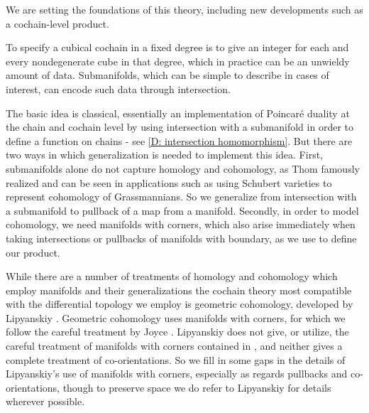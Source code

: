 We are setting the foundations of this theory, including new developments such as a cochain-level product.


To specify a cubical cochain in a fixed degree is to give an integer for each and every {nondegenerate cube} in that degree,
which in practice can be an unwieldy amount of data.
Submanifolds, which can be simple to describe in cases of interest, can encode such data through intersection.

The basic idea is classical, essentially an implementation of Poincar\'e duality at the chain and cochain level by using intersection with a
submanifold in order to define a function on chains - see \cref{D: intersection homomorphism}.
But there are two ways in which generalization is needed to implement this idea.
First, submanifolds alone do not capture homology and cohomology, as Thom famously realized and can be
seen in applications such as using Schubert varieties to represent cohomology of Grassmannians.
So we generalize from intersection with a submanifold to pullback of a map from a manifold.
Secondly, in order to model cohomology, we need manifolds with corners, which also arise immediately when taking intersections or pullbacks of manifolds with boundary, as we use to define our product.

While there are a number of treatments of homology and cohomology which employ manifolds and their
generalizations \cite{Whit47, BRS76, FeSj83, Krec10, Kahn01, Zing08, Joyc15} the cochain theory most compatible with the differential topology we employ is geometric cohomology, developed by Lipyanskiy \cite{Lipy14}.
Geometric cohomology uses manifolds with corners, for which we follow the careful treatment by Joyce \cite{Joy12}.
Lipyanskiy does not give, or utilize, the careful treatment of manifolds with corners contained in \cite{Joy12}, and neither gives a complete treatment of co-orientations. So we fill in some gaps in the details of Lipyanskiy's use of manifolds with corners, especially as regards pullbacks and co-orientations, though to preserve space we do refer to Lipyanskiy for details wherever possible.




